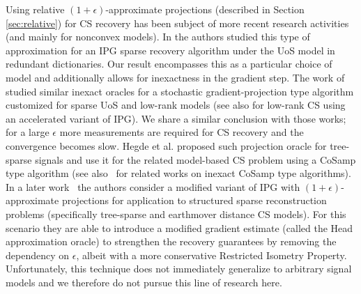 Using relative $(1+\epsilon)$-approximate projections (described in Section \ref{sec:relative}) for  CS recovery has been subject of more recent research activities (and mainly for nonconvex models). %
In \cite{GiryIPGaprox} the authors studied this type of approximation for an  IPG sparse recovery algorithm under the UoS model in redundant dictionaries. Our result encompasses this as a particular choice of model and additionally allows for inexactness in the gradient step. The work of \cite{StoIHT} studied similar inexact oracles for a stochastic gradient-projection type algorithm customized for sparse UoS and low-rank models (see also \cite{MatrixAlpsapprox} for low-rank CS using an accelerated variant of IPG). We share a similar conclusion with those works; for a large $\epsilon$ more measurements are required for CS recovery and the convergence becomes slow. 
Hegde et al. \cite{HegdeISIT} proposed such projection oracle for tree-sparse signals and use it for the related model-based CS problem using a CoSamp type algorithm (see also~\cite{daven:analysiscosamp,Giri:analysiscosamp} for related works on inexact CoSamp type algorithms).  
In a later work~\cite{Hegde15} the authors consider a modified variant of IPG with $(1+\epsilon)$-approximate projections for application to structured sparse reconstruction problems (specifically tree-sparse and earthmover distance CS models). For this scenario they are able to introduce a modified gradient estimate (called the Head approximation oracle) to strengthen the recovery guarantees by removing the dependency on $\epsilon$, albeit with a more conservative Restricted Isometry Property. Unfortunately, this technique does not immediately generalize to arbitrary signal models and we therefore do not pursue this line of research here. 







